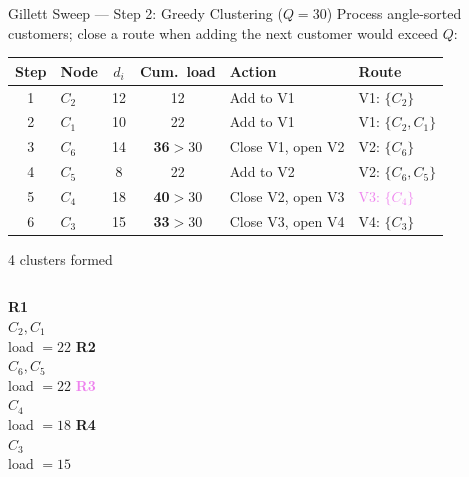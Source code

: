 \documentclass{beamer}
\begin{document}
\begin{frame}{Gillett Sweep --- Step 2: Greedy Clustering ($Q=30$)}
\small
Process angle-sorted customers; close a route when adding the next customer would exceed $Q$:
\vspace{0.4em}
\begin{tabular}{clccll}
\toprule
Step & Node & $d_i$ & Cum.\ load & Action & Route \\
\midrule
1 & $C_2$ & 12 & 12 & Add to V1 & \textcolor{green!60!black}{V1: $\{C_2\}$} \\
2 & $C_1$ & 10 & 22 & Add to V1 & \textcolor{green!60!black}{V1: $\{C_2,C_1\}$} \\
3 & $C_6$ & 14 & \textbf{36}$>$30 & Close V1, open V2 & \textcolor{orange!80!black}{V2: $\{C_6\}$} \\
4 & $C_5$ & 8  & 22 & Add to V2 & \textcolor{orange!80!black}{V2: $\{C_6,C_5\}$} \\
5 & $C_4$ & 18 & \textbf{40}$>$30 & Close V2, open V3 & \textcolor{violet}{V3: $\{C_4\}$} \\
6 & $C_3$ & 15 & \textbf{33}$>$30 & Close V3, open V4 & \textcolor{red!70!black}{V4: $\{C_3\}$} \\
\bottomrule
\end{tabular}
\vspace{0.4em}
\begin{block}{4 clusters formed}
\begin{columns}[T]
\centering\footnotesize
\textcolor{green!60!black}{\textbf{R1}}\\ $C_2,C_1$\\ load $=22$
\centering\footnotesize
\textcolor{orange!80!black}{\textbf{R2}}\\ $C_6,C_5$\\ load $=22$
\centering\footnotesize
\textcolor{violet}{\textbf{R3}}\\ $C_4$\\ load $=18$
\centering\footnotesize
\textcolor{red!70!black}{\textbf{R4}}\\ $C_3$\\ load $=15$
\end{columns}
\end{block}
\end{frame}
\end{document}

